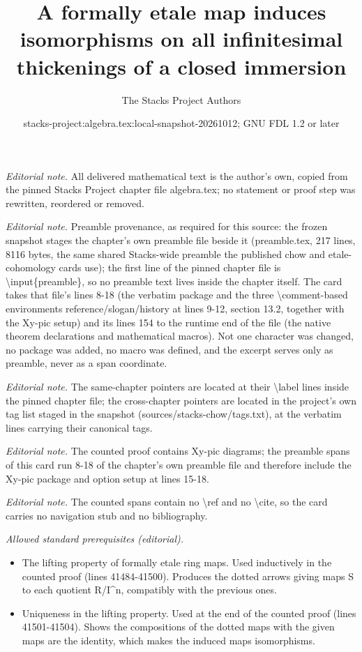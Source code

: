 \documentclass[10pt,a4paper]{amsart}
\title{A formally etale map induces isomorphisms on all infinitesimal thickenings of a closed immersion}
\author{The Stacks Project Authors}
\date{stacks-project:algebra.tex:local-snapshot-20261012; GNU FDL 1.2 or later}
\theoremstyle{plain}
\theoremstyle{definition}
\theoremstyle{remark}
\numberwithin{equation}{subsection}
\begin{document}
\maketitle
\noindent\textit{Editorial note.} All delivered mathematical text is the author's own, copied from the pinned Stacks Project chapter file algebra.tex; no statement or proof step was rewritten, reordered or removed.\par\medskip
\noindent\textit{Editorial note.} Preamble provenance, as required for this source: the frozen snapshot stages the chapter's own preamble file beside it (preamble.tex, 217 lines, 8116 bytes, the same shared Stacks-wide preamble the published chow and etale-cohomology cards use); the first line of the pinned chapter file is \textbackslash{}input\{preamble\}, so no preamble text lives inside the chapter itself. The card takes that file's lines 8-18 (the verbatim package and the three \textbackslash{}comment-based environments reference/slogan/history at lines 9-12, section 13.2, together with the Xy-pic setup) and its lines 154 to the runtime end of the file (the native theorem declarations and mathematical macros). Not one character was changed, no package was added, no macro was defined, and the excerpt serves only as preamble, never as a span coordinate.\par\medskip
\noindent\textit{Editorial note.} The same-chapter pointers are located at their \textbackslash{}label lines inside the pinned chapter file; the cross-chapter pointers are located in the project's own tag list staged in the snapshot (sources/stacks-chow/tags.txt), at the verbatim lines carrying their canonical tags.\par\medskip
\noindent\textit{Editorial note.} The counted proof contains Xy-pic diagrams; the preamble spans of this card run 8-18 of the chapter's own preamble file and therefore include the Xy-pic package and option setup at lines 15-18.\par\medskip
\noindent\textit{Editorial note.} The counted spans contain no \textbackslash{}ref and no \textbackslash{}cite, so the card carries no navigation stub and no bibliography.\par\medskip
\noindent\textit{Allowed standard prerequisites (editorial).}\begin{itemize}
\item The lifting property of formally etale ring maps. Used inductively in the counted proof (lines 41484-41500). Produces the dotted arrows giving maps S to each quotient R/I\textasciicircum{}n, compatibly with the previous ones.
\item Uniqueness in the lifting property. Used at the end of the counted proof (lines 41501-41504). Shows the compositions of the dotted maps with the given maps are the identity, which makes the induced maps isomorphisms.
\end{itemize}\medskip
\end{document}
